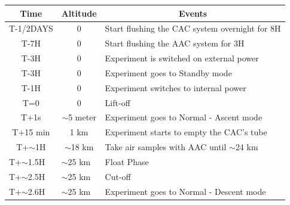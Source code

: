 \documentclass[a4paper,12pt,oneside]{article}
\begin{document}
\begin{table}[H]
\centering


\begin{tabular}{|l|l|l|}
\hline
\multicolumn{1}{|c|}{\textbf{Time}}       & \multicolumn{1}{c|}{\textbf{Altitude}}      & \multicolumn{1}{c|}{\textbf{Events}}                              \\ \hline
\multicolumn{1}{|c|}{T-1/2DAYS}    & \multicolumn{1}{c|}{0}             & Start flushing the CAC system overnight for 8H                           \\ \hline
\multicolumn{1}{|c|}{T-7H}    & \multicolumn{1}{c|}{0}             & Start flushing the AAC system for 3H                                \\ \hline
\multicolumn{1}{|c|}{T-3H}    & \multicolumn{1}{c|}{0}             & Experiment is switched on external power                                \\ \hline
\multicolumn{1}{|c|}{T-3H}    & \multicolumn{1}{c|}{0}             & Experiment goes to Standby mode                          \\ \hline
\multicolumn{1}{|c|}{T-1H}    & \multicolumn{1}{c|}{0}             & Experiment switches to internal power                                \\ \hline
\multicolumn{1}{|c|}{T=0}        & \multicolumn{1}{c|}{0}             & Lift-off                                                 \\ \hline
\multicolumn{1}{|c|}{T+1s}       & \multicolumn{1}{c|}{$\sim$5 meter} & Experiment goes to Normal - Ascent mode                  \\ \hline
\multicolumn{1}{|c|}{T+15 min}   & \multicolumn{1}{c|}{1 km}          & Experiment starts to empty the CAC's tube\\ \hline
\multicolumn{1}{|c|}{T+$\sim$1H} & \multicolumn{1}{c|}{$\sim$18 km}   & Take air samples with AAC until $\sim$24 km                       \\ \hline
T+$\sim$1.5H                     & $\sim$25 km                        & Float Phase                                           \\ \hline
T+$\sim$2.5H                     & $\sim$25 km                        & Cut-off                                                  \\ \hline
T+$\sim$2.6H                     & $\sim$25 km                        & Experiment goes to Normal - Descent mode                 \\ \hline

\end{tabular}
\end{table}
\end{document}
